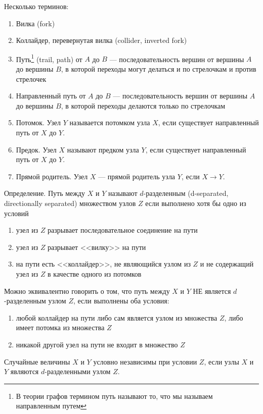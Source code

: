 Несколько терминов:
\begin{enumerate}
\item Вилка (fork)
\item Коллайдер, перевернутая вилка (collider, inverted fork)
\item Путь\footnote{В теории графов термином путь называют то, что мы называем направленным путем} (trail, path) от $A$ до $B$ --- последовательность вершин от вершины $A$ до вершины $B$, в которой переходы могут делаться и по стрелочкам и против стрелочек
\item Направленный путь от $A$ до $B$ --- последовательность вершин от вершины $A$ до вершины $B$, в которой переходы делаются только по стрелочкам
\item Потомок. Узел $Y$ называется потомком узла $X$, если существует направленный путь от $X$ до $Y$.
\item Предок. Узел $X$ называют предком узла $Y$, если существует направленный путь от $X$ до $Y$.
\item Прямой родитель. Узел $X$ --- прямой родитель узла $Y$, если $X\to Y$.

\end{enumerate}


Определение. Путь между $X$ и $Y$ называют $d$-разделенным (d-separated, directionally separated) множеством узлов $Z$ если выполнено хотя бы одно из условий
\begin{enumerate}
\item узел из $Z$ разрывает последовательное соединение на пути
\item узел из $Z$ разрывает <<вилку>> на пути
\item на пути есть <<коллайдер>>, не являющийся узлом из $Z$ и не содержащий узел из $Z$ в качестве одного из потомков
\end{enumerate}


Можно эквивалентно говорить о том, что путь между $X$ и $Y$ НЕ является $d$-разделенным узлом $Z$, если выполнены оба условия:
\begin{enumerate}
\item любой коллайдер на пути либо сам является узлом из множества $Z$, либо имеет потомка из множества $Z$
\item никакой другой узел на пути не входит в множество $Z$
\end{enumerate}


Случайные величины $X$ и $Y$ условно независимы при условии $Z$, если узлы $X$ и $Y$ являются $d$-разделенными узлом $Z$.


